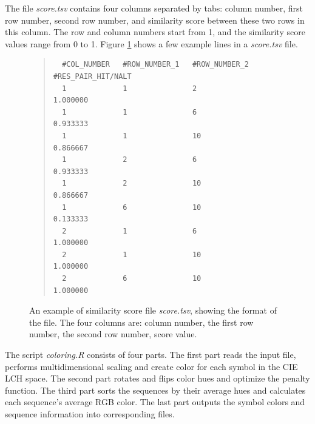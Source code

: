 The file \emph{score.tsv} contains four columns separated by tabs: column number, first row number, second row number, and similarity score between these two rows in this column. The row and column numbers start from 1, and the similarity score values range from 0 to 1. Figure \ref{fig:score.tsv} shows a few example lines in a \emph{score.tsv} file.
\begin{figure}[hb]
\begin{quote}
\begin{verbatim}
  #COL_NUMBER   #ROW_NUMBER_1   #ROW_NUMBER_2   #RES_PAIR_HIT/NALT
  1             1               2               1.000000
  1             1               6               0.933333
  1             1               10              0.866667
  1             2               6               0.933333
  1             2               10              0.866667
  1             6               10              0.133333
  2             1               6               1.000000
  2             1               10              1.000000
  2             6               10              1.000000
\end{verbatim}
\end{quote}
\caption[Example of Similarity Score File]{An example of similarity score file \emph{score.tsv}, showing the format of the file. The four columns are: column number, the first row number, the second row number, score value.}\label{fig:score.tsv}
\end{figure}

The script \emph{coloring.R} consists of four parts. The first part reads the input file, performs multidimensional scaling and create color for each symbol in the CIE LCH space. The second part rotates and flips color hues and optimize the penalty function. The third part sorts the sequences by their average hues and calculates each sequence’s average RGB color. The last part outputs the symbol colors and sequence information into corresponding files.

